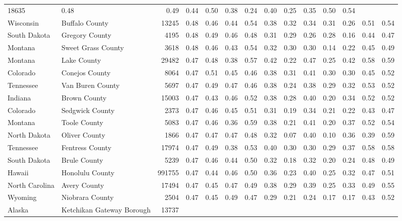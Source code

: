 \documentclass[10pt, letterpaper]{article}
\begin{document}
\begin{spacing}{1.4}
\begin{table}
{\begin{tabular}{llrrrrrrrrrrrr}
    18635 & 0.48 & 0.49 & 0.44 & 0.50 & 0.38 & 0.24 &
    0.40 & 0.25 & 0.35 & 0.50 & 0.54 \\ Wisconsin & Buffalo
    County & 13245 & 0.48 & 0.46 & 0.44 & 0.54 & 0.38 &
    0.32 & 0.34 & 0.31 & 0.26 & 0.51 & 0.54 \\ South
    Dakota & Gregory County & 4195 & 0.48 & 0.49 & 0.46 & 0.48 &
    0.31 & 0.29 & 0.26 & 0.28 & 0.16 & 0.44 & 0.47
    \\ Montana & Sweet Grass County & 3618 & 0.48 & 0.46 & 0.43 &
    0.54 & 0.32 & 0.30 & 0.30 & 0.14 & 0.22 & 0.45 &
    0.49 \\ Montana & Lake County & 29482 & 0.47 & 0.48 & 0.38 &
    0.57 & 0.42 & 0.22 & 0.47 & 0.25 & 0.42 & 0.58 &
    0.59 \\ Colorado & Conejos County & 8064 & 0.47 & 0.51 &
    0.45 & 0.46 & 0.38 & 0.31 & 0.41 & 0.30 & 0.30 &
    0.45 & 0.52 \\ Tennessee & Van Buren County & 5697 & 0.47 &
    0.49 & 0.47 & 0.46 & 0.38 & 0.24 & 0.38 & 0.29 &
    0.32 & 0.53 & 0.52 \\ Indiana & Brown County & 15003 & 0.47
    & 0.43 & 0.46 & 0.52 & 0.38 & 0.28 & 0.40 & 0.20
    & 0.34 & 0.52 & 0.52 \\ Colorado & Sedgwick County & 2373 &
    0.47 & 0.46 & 0.45 & 0.51 & 0.31 & 0.19 & 0.34 &
    0.21 & 0.22 & 0.43 & 0.47 \\ Montana & Toole County & 5083 &
    0.47 & 0.46 & 0.36 & 0.59 & 0.38 & 0.21 & 0.41 &
    0.20 & 0.37 & 0.52 & 0.54 \\ North Dakota & Oliver County &
    1866 & 0.47 & 0.47 & 0.47 & 0.48 & 0.32 & 0.07 &
    0.40 & 0.10 & 0.36 & 0.39 & 0.59 \\ Tennessee & Fentress
    County & 17974 & 0.47 & 0.49 & 0.38 & 0.53 & 0.40 &
    0.30 & 0.30 & 0.29 & 0.37 & 0.58 & 0.58 \\ South
    Dakota & Brule County & 5239 & 0.47 & 0.46 & 0.44 & 0.50 &
    0.32 & 0.18 & 0.32 & 0.20 & 0.24 & 0.48 & 0.49
    \\ Hawaii & Honolulu County & 991755 & 0.47 & 0.44 & 0.46 &
    0.50 & 0.36 & 0.23 & 0.40 & 0.25 & 0.32 & 0.47 &
    0.51 \\ North Carolina & Avery County & 17494 & 0.47 & 0.45 &
    0.47 & 0.49 & 0.38 & 0.29 & 0.39 & 0.25 & 0.33 &
    0.49 & 0.55 \\ Wyoming & Niobrara County & 2504 & 0.47 &
    0.45 & 0.49 & 0.47 & 0.29 & 0.21 & 0.24 & 0.17 &
    0.17 & 0.43 & 0.52 \\ Alaska & Ketchikan Gateway Borough & 13737

\end{tabular}}
\end{table}
\end{spacing}
\end{document}
